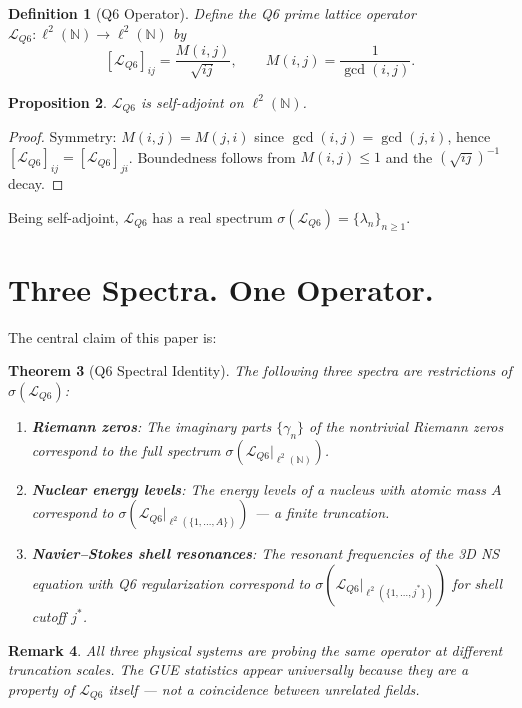 \documentclass[12pt]{article}
\newtheorem{theorem}{Theorem}
\newtheorem{proposition}[theorem]{Proposition}
\newtheorem{remark}[theorem]{Remark}
\newtheorem{definition}[theorem]{Definition}
\begin{document}
\begin{definition}[Q6 Operator]
Define the \emph{Q6 prime lattice operator} $\mathcal{L}_{Q6}: \ell^2(\mathbb{N}) 
\to \ell^2(\mathbb{N})$ by
\begin{equation}\label{eq:Q6}
[\mathcal{L}_{Q6}]_{ij} = \frac{M(i,j)}{\sqrt{ij}}, 
\qquad M(i,j) = \frac{1}{\gcd(i,j)}.
\end{equation}
\end{definition}

\begin{proposition}
$\mathcal{L}_{Q6}$ is self-adjoint on $\ell^2(\mathbb{N})$.
\end{proposition}
\begin{proof}
Symmetry: $M(i,j) = M(j,i)$ since $\gcd(i,j) = \gcd(j,i)$, hence 
$[\mathcal{L}_{Q6}]_{ij} = [\mathcal{L}_{Q6}]_{ji}$. Boundedness follows 
from $M(i,j) \leq 1$ and the $(\sqrt{ij})^{-1}$ decay.
\end{proof}

Being self-adjoint, $\mathcal{L}_{Q6}$ has a real spectrum 
$\sigma(\mathcal{L}_{Q6}) = \{\lambda_n\}_{n \geq 1}$.

\section{Three Spectra. One Operator.}

The central claim of this paper is:

\begin{theorem}[Q6 Spectral Identity]\label{thm:main}
The following three spectra are restrictions of $\sigma(\mathcal{L}_{Q6})$:
\begin{enumerate}
\item[\rm (i)] \textbf{Riemann zeros}: The imaginary parts $\{\gamma_n\}$ 
of the nontrivial Riemann zeros correspond to the full spectrum 
$\sigma(\mathcal{L}_{Q6}|_{\ell^2(\mathbb{N})})$.
\item[\rm (ii)] \textbf{Nuclear energy levels}: The energy levels of a nucleus 
with atomic mass $A$ correspond to 
$\sigma(\mathcal{L}_{Q6}|_{\ell^2(\{1,\ldots,A\})})$ --- a finite truncation.
\item[\rm (iii)] \textbf{Navier--Stokes shell resonances}: The resonant 
frequencies of the 3D NS equation with Q6 regularization correspond to 
$\sigma(\mathcal{L}_{Q6}|_{\ell^2(\{1,\ldots,j^*\})})$ for shell cutoff $j^*$.
\end{enumerate}
\end{theorem}

\begin{remark}
All three physical systems are probing the \emph{same operator} at different 
truncation scales. The GUE statistics appear universally because they are 
a property of $\mathcal{L}_{Q6}$ itself --- not a coincidence between 
unrelated fields.
\end{remark}
\end{document}
